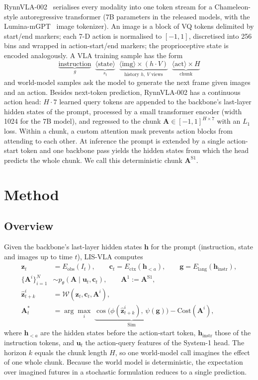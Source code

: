 \documentclass[11pt]{article}
\newcommand{\zt}{\bm{z}_t}
\newcommand{\A}{\mathbf{A}}
\newcommand{\WM}{\mathcal{W}}
\begin{document}
RynnVLA-002~\citep{cen2025rynnvla002} serialises every modality into one token stream for a Chameleon-style autoregressive transformer (7B parameters in the released models, with the Lumina-mGPT~\citep{liu2024luminamgpt} image tokenizer). An image is a block of VQ tokens delimited by start/end markers; each 7-D action is normalised to $[-1,1]$, discretised into 256 bins and wrapped in action-start/end markers; the proprioceptive state is encoded analogously. A VLA training sample has the form
\begin{equation*}
\underbrace{\text{instruction}}_{g}\;\;\underbrace{\langle\text{state}\rangle}_{s_t}\;\;\underbrace{\langle\text{img}\rangle\times(h\cdot V)}_{\text{history } h,\ V \text{ views}}\;\;\underbrace{\langle\text{act}\rangle\times H}_{\text{chunk}}
\end{equation*}
and world-model samples ask the model to generate the next frame given images and an action. Besides next-token prediction, RynnVLA-002 has a continuous action head: $H\cdot 7$ learned query tokens are appended to the backbone's last-layer hidden states of the prompt, processed by a small transformer encoder (width 1024 for the 7B model), and regressed to the chunk $\A\in[-1,1]^{H\times 7}$ with an $L_1$ loss. Within a chunk, a custom attention mask prevents action blocks from attending to each other. At inference the prompt is extended by a single action-start token and one backbone pass yields the hidden states from which the head predicts the whole chunk. We call this deterministic chunk $\A^{\mathrm{S1}}$.

\section{Method}
\label{sec:method}

\subsection{Overview}
Given the backbone's last-layer hidden states $\bm h$ for the prompt (instruction, state and images up to time $t$), LIS-VLA computes
\begin{align}
\zt &= E_{\mathrm{obs}}(I_t), \qquad \bm c_t = E_{\mathrm{ctx}}(\bm h_{<a}), \qquad \bm g = E_{\mathrm{lang}}(\bm h_{\mathrm{instr}}), \label{eq:enc}\\
\{\A^i\}_{i=1}^{N} &\sim p_\theta(\A \mid \bm u_t, \bm c_t), \qquad \A^1 := \A^{\mathrm{S1}}, \label{eq:prop}\\
\hat{\bm z}^i_{t+k} &= \WM(\zt, \bm c_t, \A^i), \label{eq:wm}\\
\A^*_t &= \arg\max_{i}\; \underbrace{\cos\!\big(\phi(\hat{\bm z}^i_{t+k}),\, \psi(\bm g)\big)}_{\mathrm{Sim}} - \mathrm{Cost}(\A^i), \label{eq:select}
\end{align}
where $\bm h_{<a}$ are the hidden states before the action-start token, $\bm h_{\mathrm{instr}}$ those of the instruction tokens, and $\bm u_t$ the action-query features of the System-1 head. The horizon $k$ equals the chunk length $H$, so one world-model call imagines the effect of one whole chunk. Because the world model is deterministic, the expectation over imagined futures in a stochastic formulation reduces to a single prediction.
\end{document}
